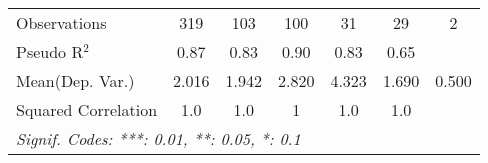 \begin{tabular}{lcccccc}
   Observations                                               & 319      & 103           & 100          & 31      & 29           & 2\\  
   Pseudo R$^2$                                               & 0.87     & 0.83          & 0.90         & 0.83    & 0.65         & \\  
Mean(Dep. Var.) & 2.016 & 1.942 & 2.820 & 4.323 & 1.690 & 0.500 \\
   Squared Correlation                                        & 1.0      & 1.0           & 1            & 1.0     & 1.0          & \\  
   \midrule \midrule
   \multicolumn{7}{l}{\emph{Signif. Codes: ***: 0.01, **: 0.05, *: 0.1}}\\
\end{tabular}
\par\endgroup
